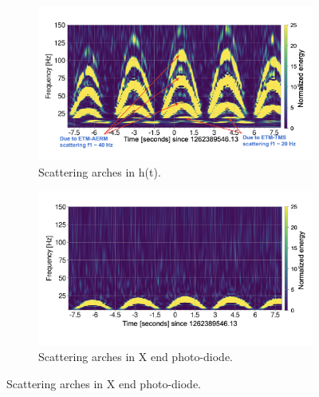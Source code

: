 \documentclass[12pt]{iopart}
\begin{document}
\begin{figure}[h]
\captionsetup[subfigure]{font=scriptsize,labelfont=scriptsize}
   \centering
    \begin{subfigure}[b]{0.45\textwidth}
        \centering
         \includegraphics[width= \textwidth]{1262389546darm_new.png}
         \caption{Scattering arches in h(t).}
         \label{fig:1262darm}
    \end{subfigure}
    \begin{subfigure}[b]{0.45\textwidth}
        \centering
         \includegraphics[width =\textwidth]{1262389546trans_new.png}
         \caption{Scattering arches in X end photo-diode.}
         \label{fig:1262trans}
     \end{subfigure}

\end{figure}
\end{document}

